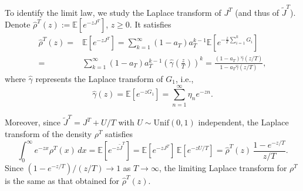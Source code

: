 \documentclass[letterpaper]{article}
\numberwithin{equation}{section}
\theoremstyle{definition}
\theoremstyle{remark}
\begin{document}
  {To identify the limit law, we study the Laplace transform of $J^T$ (and thus of $\widetilde J^T$). Denote $\hat\rho^T(z):=\mathbb{E}[e^{-zJ^T}]$, $z\ge0$. It satisfies}
  \begin{equation}\label{laplaceofjn}
  \begin{aligned}
    \hat\rho^T(z)
    =&\mathbb E[e^{-zJ^T}]
    =\sum_{k=1}^\infty (1-a_T)a_T^{k-1}\mathbb E\left[e^{-\frac{z}{T}\sum_{i=1}^kG_i}\right]\\
    =&\sum_{k=1}^\infty (1-a_T)a_T^{k-1}\left( \hat\gamma\left(\frac{z}{T}\right) \right)^k
    =\frac{(1-a_T)\hat\gamma(z/T)}{1-a_T\hat\gamma(z/T)},
  \end{aligned}
  \end{equation}
  where $\hat\gamma$ represents the Laplace transform of $G_1$, i.e.,
  \[
    \hat\gamma(z)=\mathbb E[e^{-zG_1}]=\sum_{n=1}^\infty \eta_ne^{-zn}.
  \]

{Moreover, since $\widetilde J^T=J^T+U/T$ with $U\sim\mathrm{Unif}(0,1)$ independent, the Laplace transform of the density $\rho^T$ satisfies}
\begin{equation*}
{
\int_0^\infty e^{-zx}\rho^T(x)\,dx
=\mathbb{E}[e^{-z\widetilde J^T}]
=\mathbb{E}[e^{-zJ^T}]\,\mathbb{E}[e^{-zU/T}]
=\hat\rho^T(z)\,\frac{1-e^{-z/T}}{z/T}.}
\end{equation*}
{Since $(1-e^{-z/T})/(z/T)\to1$ as $T\to\infty$, the limiting Laplace transform for $\rho^T$ is the same as that obtained for $\hat\rho^T(z)$.}
\end{document}
